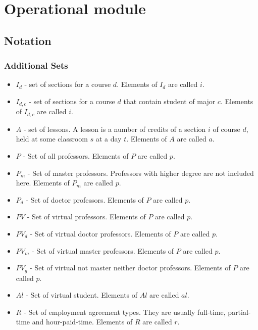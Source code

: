 \newpage

\section{Operational module}


\subsection{Notation}

\subsubsection{Additional Sets}
\begin{itemize}
\item $I_{d}$ - set of sections for a course $d$.  Elements of $I_{d}$ are called $i$.
\item $I_{d,c}$ - set of sections for a course $d$ that contain student of major $c$. Elements of $I_{d,c}$ are called $i$.
\item $A$ - set of lessons. A lesson is a number of credits of a section $i$ of course $d$, held at some classroom $s$ at a day $t$. Elements of $A$ are called $a$.
\item $P$ - Set of all professors. Elements of $P$ are called $p$.
\item $P_{m}$ - Set of master professors. Professors with higher degree are not included here. Elements of $P_{m}$ are called $p$.
\item $P_{d}$ - Set of doctor professors. Elements of $P$ are called $p$.
\item $PV$ - Set of virtual professors. Elements of $P$ are called $p$.
\item $PV_{d}$ - Set of virtual doctor professors. Elements of $P$ are called $p$.
\item $PV_{m}$ - Set of virtual master professors. Elements of $P$ are called $p$.
\item $PV_{g}$ - Set of virtual not master neither doctor professors. Elements of $P$ are called $p$.
\item $Al$ - Set of virtual student. Elements of $Al$ are called $al$.
\item $R$ - Set of employment agreement types. They are usually full-time, partial-time and hour-paid-time. Elements of $R$ are called $r$.
\end{itemize}

